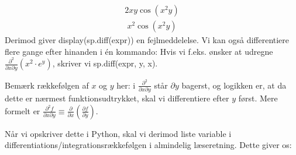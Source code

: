 \documentclass[letterpaper,10pt,english]{jupyterBook}
\begin{document}
\begin{sphinxVerbatim}[commandchars=\\\{\}]
             
        
        
\end{sphinxVerbatim}
\begin{equation*}
\begin{split}\displaystyle 2 x y \cos{\left(x^{2} y \right)}\end{split}
\end{equation*}\begin{equation*}
\begin{split}\displaystyle x^{2} \cos{\left(x^{2} y \right)}\end{split}
\end{equation*}
Derimod giver display(sp.diff(expr)) en fejlmeddelelse. Vi kan også differentiere flere gange efter hinanden i én kommando: Hvis vi f.eks. ønsker at udregne \(\frac{\partial^2}{\partial x \partial y}\left ( x^2\cdot e^y\right )\), skriver vi sp.diff(expr, y, x).

Bemærk rækkefølgen af \(x\) og \(y\) her: i \(\frac{\partial^2}{\partial x \partial y}\) står \(\partial y\) bagerst, og logikken er, at da dette er nærmest funktionsudtrykket, skal vi differentiere efter \(y\) først. Mere formelt er \(\frac{\partial^2f}{\partial x \partial y} \equiv \frac{\partial}{\partial x}\left ( \frac{\partial f}{\partial y} \right )\).

Når vi opskriver dette i Python, skal vi derimod liste variable i differentiations/integrationsrækkefølgen i almindelig læseretning. Dette giver os:
\end{document}
